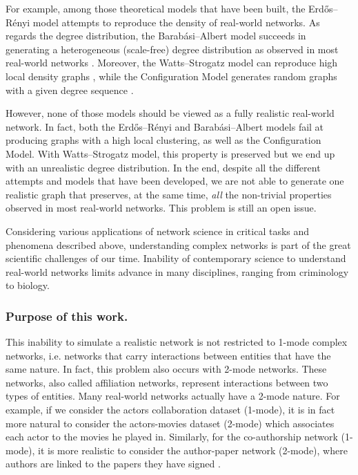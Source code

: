 \documentclass[table]{report}
\begin{document}
\medbreak

For example, among those theoretical models that have been built, the Erdős–Rényi model attempts to reproduce the density of real-world networks. As regards the degree distribution, the Barabási–Albert model succeeds in generating a heterogeneous (scale-free) degree distribution as observed in most real-world networks \cite{barabasi}. Moreover, the Watts–Strogatz model can reproduce high local density graphs \cite{watts_strogatz}, while the Configuration Model generates random graphs with a given degree sequence \cite{newman}.

However, none of those models should be viewed as a fully realistic real-world network. In fact, both the Erdős–Rényi and  Barabási–Albert models fail at producing graphs with a high local clustering, as well as the Configuration Model. With Watts–Strogatz model, this property is preserved but we end up with an unrealistic degree distribution. In the end, despite all the different attempts and models that have been developed, we are not able to generate one realistic graph that preserves, at the same time, \textit{all} the non-trivial properties observed in most real-world networks. This problem is still an open issue.

\medbreak


Considering various applications of network science in critical tasks and phenomena described above, understanding complex networks is part of the great scientific challenges of our time. Inability of contemporary science to understand real-world networks limits advance in many disciplines, ranging from criminology to biology. 



\subsubsection{Purpose of this work.}
\medbreak

\bigbreak

This inability to simulate a realistic network is not restricted to 1-mode complex networks, i.e. networks that carry interactions between entities that have the same nature. In fact, this problem also occurs with 2-mode networks. These networks, also called affiliation networks, represent interactions between two types of entities. Many real-world networks actually have a 2-mode nature. For example, if we consider the actors collaboration dataset (1-mode), it is in fact more natural to consider the actors-movies dataset (2-mode) which associates each actor to the movies he played in. Similarly, for the co-authorship network (1-mode), it is more realistic to consider the author-paper network (2-mode), where authors are linked to the papers they have signed \cite{latapy}. 
\end{document}
